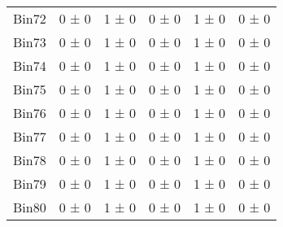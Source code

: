 \begin{tabular}{@{\extracolsep{4pt}}lccccc@{}}
     Bin72 & 0 ± 0 & 1 ± 0 & 0 ± 0 & 1 ± 0 & 0 ± 0 \\ 
     Bin73 & 0 ± 0 & 1 ± 0 & 0 ± 0 & 1 ± 0 & 0 ± 0 \\ 
     Bin74 & 0 ± 0 & 1 ± 0 & 0 ± 0 & 1 ± 0 & 0 ± 0 \\ 
     Bin75 & 0 ± 0 & 1 ± 0 & 0 ± 0 & 1 ± 0 & 0 ± 0 \\ 
     Bin76 & 0 ± 0 & 1 ± 0 & 0 ± 0 & 1 ± 0 & 0 ± 0 \\ 
     Bin77 & 0 ± 0 & 1 ± 0 & 0 ± 0 & 1 ± 0 & 0 ± 0 \\ 
     Bin78 & 0 ± 0 & 1 ± 0 & 0 ± 0 & 1 ± 0 & 0 ± 0 \\ 
     Bin79 & 0 ± 0 & 1 ± 0 & 0 ± 0 & 1 ± 0 & 0 ± 0 \\ 
     Bin80 & 0 ± 0 & 1 ± 0 & 0 ± 0 & 1 ± 0 & 0 ± 0 \\ 
\hline\hline
  \end{tabular}
